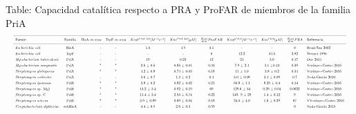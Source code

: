 \documentclass[]{article}
\begin{document}
\begin{landscape}  
Table: Capacidad catalítica respecto a PRA y ProFAR de miembros de la familia PriA \label{tab:cineticos} 
$$
\resizebox{\columnwidth}{!}{%
\begin{tabular}{ l c r c c c c c c c l}
\hline \\ [-1.5ex]
Fuente  &Familia & HisA $in\hspace{.1cm}vivo$ &TrpF $in\hspace{.1cm}vivo$ & $K{cat}^{ProFAR}[M^{-1}s^{-1}]$ & $Km^{ProFAR}[\mu M]$& $\frac{K{cat}}{Km} ProFAR$ & $K{cat}^{PRA}[M^{-1}s^{-1}]$ & $Km^{PRA}[\mu M]$  &  $\frac{Kcat}{Km} PRA $  &Referencia  \\ [1ex]
\hline \\ [-1.5ex]  
\textit{Escherichia} \textit{coli}         & HisA &- &- & 1.6 & 4.9 & 3.1 & -   & -   & 0   & Henn-Sax 2002 \\ [1ex]  
\textit{Escherichia}  \textit{coli}        &TrpF  &- &- &-    &-    &0    & 12.2& 34.5& 2.82& Sterner 1996 \\ [1ex]    
\textit{Mycobacterium} \textit{tuberculosis} &PriA&-&-&19&0.23&12&21&3.6&0.17& Due 2011\\ [1ex]    
\textit{Mycobacterium}  \textit{smegmatis} &PriA&*&*& 2.6 ± 0.5 & 0.85 $ \pm $ 0.04 &0.33& 7.9 $ \pm $  2.4& 3.1 $ \pm $0.43  &0.39& Verduzco-Castro 2016 \\ [1ex]   
\textit{Streptomyces} \textit{globisporus}  &PriA&*&*& 4.2 ± 0.8& 0.74 ± 0.03 &0.18& 11 ± 1.0 & 3.8 ± 0.2 &0.34& Verduzco-Castro 2016\\ [1ex]  
\textit{Streptomyces} \textit{coelicolor} &PriA&-&-& 3.6 ± 0.7 & 1.3 ± 0.2 &0.4& 5.0 ± 0.08 & 3.4 ± 0.09 &0.7& Noda-Garcia 2010\\ [1ex]   
\textit{Streptomyces} \textit{ipomoeae}  &PriB&*&*& 3.8 ± 0.2 & 0.82 ± 0.02 &0.21& 60.8 ± 1.1&  8.25 ± 0.4&0.14& Verduzco-Castro 2016\\ [1ex]   
\textit{Streptomyces} sp. Mg1  &PriB&*&*& 13.2 ± 3.4 &0.92 ± 0.19 &69&129.6 ± 34 &0.29 ± 0.04&0.0022&Verduzco-Castro 2016\\ [1ex]  
\textit{Streptomyces} sp. C&PriB&*&*&11.4 ± 3.4 &2.53 ± 0.74 &0.22&149. 9 ± 29& 1.4 ± 0.12 &9&Verduzco-Castro 2016\\ [1ex]    
\textit{Streptomyces} \textit{sviceus} &PriB&*&*&3.9 ± 0.89 &0.69 ± 0.04 &0.18&24.5 ± 4.0& 1.6 ± 0.29 &67&VVerduzco-Castro 2016\\ [1ex]   
\textit{Corynebacterium} \textit{diphteriae} &subHisA&-&-&4.4 ± 0.5&2.6 ± 0.3&0.59&&&0& Noda-Garcia 2013\\ [1ex]    

\end{tabular}}$$
\end{landscape}
\end{document}
